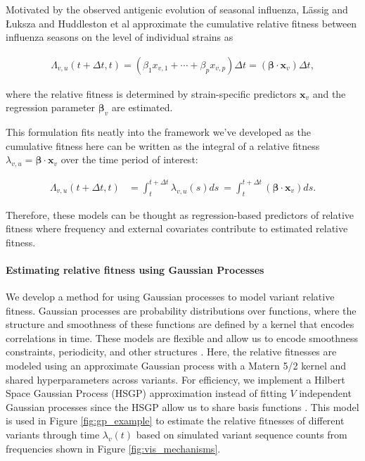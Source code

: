 \documentclass[12pt,oneside,letterpaper]{article}
\renewcommand{\vec}[1]{\boldsymbol{#1}}
\def\tbc#1{\textcolor{purple}{[#1]}}
\begin{document}
Motivated by the observed antigenic evolution of seasonal influenza, L{\"a}ssig and {\L}uksza \cite{luksza2014predictive} and Huddleston et al \cite{Huddleston2020} approximate the cumulative relative fitness between influenza seasons on the level of individual strains as

\begin{align*}
    \Lambda_{v,u}(t + \Delta t,t) = (\beta_{1} x_{v,1} + \cdots + \beta_{p} x_{v, p})\Delta t = (\vec{\beta} \cdot \vec{x}_{v}) \Delta t,
\end{align*}

where the relative fitness is determined by strain-specific predictors $\vec{x}_{v}$ and the regression parameter $\vec{\beta}_{v}$ are estimated. 

This formulation fits neatly into the framework we've developed as the cumulative fitness here can be written as the integral of a relative fitness $\lambda_{v, u} =  \vec{\beta} \cdot \vec{x}_{v}$ over the time period of interest:

\begin{align*}
    \Lambda_{v,u}(t + \Delta t,t)  &= \int_{t}^{t+\Delta t} \lambda_{v,u}(s)ds\ = \int_{t}^{t + \Delta t} (\vec{\beta} \cdot \vec{x}_{v}) ds.
\end{align*}

Therefore, these models can be thought as regression-based predictors of relative fitness where frequency and external covariates contribute to estimated relative fitness.


\paragraph{Estimating relative fitness using Gaussian Processes}%

We develop a method for using Gaussian processes to model variant relative fitness.
Gaussian processes are probability distributions over functions, where the structure and smoothness of these functions are defined by a kernel that encodes correlations in time.
These models are flexible and allow us to encode smoothness constraints, periodicity, and other structures \cite{Görtler2019a}.
Here, the relative fitnesses are modeled using an approximate Gaussian process with a Matern 5/2 kernel and shared hyperparameters across variants.
For efficiency, we implement a Hilbert Space Gaussian Process (HSGP) approximation instead of fitting $V$ independent Gaussian processes since the HSGP allow us to share basis functions \cite{riutortmayol2022practical}.
This model is used in Figure \ref{fig:gp_example} to estimate the relative fitnesses of different variants through time $\lambda_v(t)$ based on simulated variant sequence counts from frequencies shown in Figure \ref{fig:vis_mechanisms}.
\end{document}
